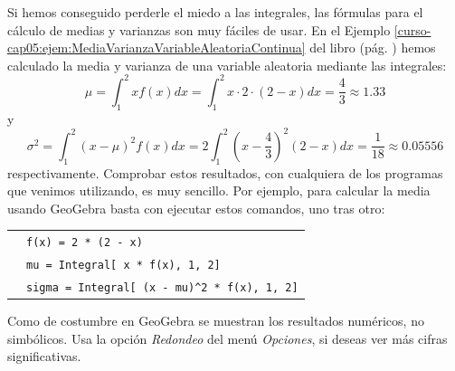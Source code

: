 \documentclass[10pt,a4paper]{article}\usepackage[]{graphicx}\usepackage[]{color}
\begin{document}
Si hemos conseguido perderle el miedo a las integrales, las fórmulas para el cálculo de medias y varianzas son muy fáciles de usar. En el Ejemplo \ref{curso-cap05:ejem:MediaVarianzaVariableAleatoriaContinua} del libro (pág. \pageref{curso-cap05:ejem:MediaVarianzaVariableAleatoriaContinua}) hemos calculado la media y varianza de una variable aleatoria mediante las integrales:
    \[
    \mu=\int_{1}^{2}  x f(x)dx=\int_{1}^{2}x\cdot 2\cdot(2-x)dx=\dfrac{4}{3}\approx 1.33 \]
y
    \[
    \sigma^2=
    \int_{1}^{2}(x-\mu)^2f(x)dx =
    2\int_{1}^{2}\left(x-\dfrac{4}{3}\right)^2(2-x)dx=\dfrac{1}{18}\approx 0.05556
    \]
respectivamente. Comprobar estos resultados, con cualquiera de los programas que venimos utilizando, es muy sencillo. Por ejemplo, para calcular la media usando GeoGebra basta con ejecutar estos comandos, uno tras otro:
\begin{center}
\begin{tabular}{ll}
    &\verb#f(x) = 2 * (2 - x)#\\
    &\verb#mu = Integral[ x * f(x), 1, 2]#\\
    &\verb#sigma = Integral[ (x - mu)^2 * f(x), 1, 2]#
\end{tabular}
\end{center}
Como de costumbre en GeoGebra se muestran los resultados numéricos, no simbólicos. Usa la opción {\em Redondeo} del menú {\em Opciones}, si deseas ver más cifras significativas.
\end{document}
